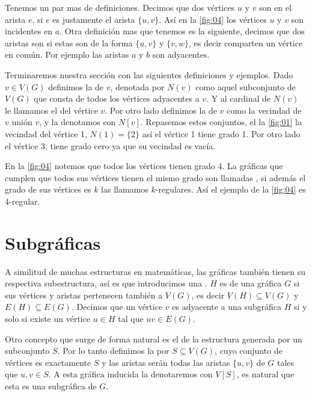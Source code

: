 Tenemos un par mas de definiciones.
Decimos que dos vértices $u$ y $v$ son  en el arista $e$, si $e$ es justamente el arista $\{ u,v\}$.
Así en la \cref{fig:04} los vértices $u$ y $v$ son incidentes en $a$.
Otra definición mas que tenemos es la siguiente, decimos que dos aristas son  si estas son de la forma $\{ u,v\}$ y $\{ v,w\}$, es decir comparten un vértice en común. Por ejemplo las aristas $a$ y $b$ son adyacentes. 

Terminaremos nuestra sección con las siguientes definiciones y ejemplos.
Dado $v\in V(G)$ definimos la  de $v$, denotada por $N(v)$ como aquel subconjunto de $V(G)$ que consta de todos los vértices adyacentes a $v$. Y al cardinal de $N(v)$ le llamamos el  del vértice $v$. Por otro lado definimos la  de $v$ como la vecindad de $v$ unión $v$, y la denotamos con $N[v]$.
Repasemos estos conjuntos, el la \cref{fig:01} la vecindad del vértice 1, $N(1)= \{ 2 \}$  así el vértice 1 tiene grado 1. Por otro lado el vértice 3, tiene grado cero ya que su vecindad es vacía.

En la \cref{fig:04} notemos que todos los vértices tienen grado 4. La gráficas que cumplen que todos sus vértices tienen el mismo grado son llamadas , si además el grado de sus vértices es $k$ las llamamos $k$-regulares. Así el ejemplo de la \cref{fig:04} es 4-regular.

\section{Subgráficas}
\label{sec:SbGrfcs}

A similitud de muchas estructuras en matemáticas, las gráficas también tienen su respectiva subestructura, así es que introducimos una . 
$H$ es  de una gráfica $G$ si sus vértices y aristas pertenecen también a $V(G)$, es decir $V(H)\subseteq V(G)$ y $E(H) \subseteq E(G) $. Decimos que un vértice $v$ es adyacente a una subgráfica $H$ si y solo si existe un vértice $u\in H$ tal que $uv\in E(G)$.

Otro concepto que surge de forma natural es el de la estructura generada por un subconjunto $S$.
Por lo tanto definimos la  por $S\subseteq V(G)$, cuyo conjunto de vértices es exactamente $S$ y las aristas serán todas las aristas $\{u,v\} $ de $G$ tales que $u,v \in S$. A esta gráfica inducida la denotaremos con $V[S]$, es natural que esta es una subgráfica de $G$.

